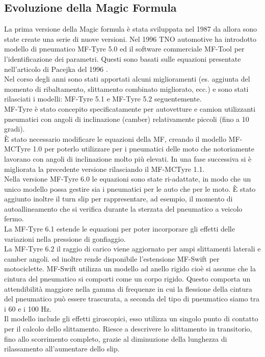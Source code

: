 \subsection{Evoluzione della Magic Formula}
La prima versione della Magic formula è stata sviluppata nel 1987 da allora sono state create una serie di nuove versioni.
Nel 1996 TNO automotive ha introdotto modello di pneumatico MF-Tyre 5.0 ed il software commerciale MF-Tool per l'identificazione dei parametri. Questi sono basati sulle equazioni presentate nell'articolo di Pacejka del 1996 \cite{Pacejka1997MagicFT}.\\ 
Nel corso degli anni sono stati apportati alcuni miglioramenti (es. aggiunta del
momento di ribaltamento, slittamento combinato migliorato, ecc.) e sono stati rilasciati i modelli: MF-Tyre 5.1 e MF-Tyre 5.2 seguentemente.\\ 
MF-Tyre è stato concepito specificatamente per autovetture e camion utilizzanti pneumatici con
angoli di inclinazione (camber) relativamente piccoli (fino a 10 gradi).\\
È stato necessario modificare le equazioni della MF, creando il modello MF-MCTyre 1.0 per poterlo utilizzare per i pneumatici delle moto che notoriamente lavorano con angoli di inclinazione molto più elevati. In una fase successiva si è migliorata la precedente versione rilasciando il MF-MCTyre 1.1.\\
Nella versione MF-Tyre 6.0 le equazioni sono state ri-adattate, in modo che un unico modello possa gestire sia i pneumatici per le auto che per le moto.
È stato aggiunto inoltre il turn slip per rappresentare, ad esempio, il momento di autoallineamento
che si verifica durante la sterzata del pneumatico a veicolo fermo.\\ 
La MF-Tyre 6.1 estende le equazioni per poter incorporare gli effetti delle variazioni nella pressione di gonfiaggio.\\
La MF-Tyre 6.2 il raggio di carico viene aggiornato per ampi slittamenti laterali e camber
angoli. ed inoltre rende disponibile l'estensione MF-Swift per motociclette. MF-Swift utilizza un modello ad anello rigido cioè si assume che la cintura del pneumatico si comporti come un corpo rigido. Questo comporta un attendibilità maggiore nella gamma di frequenze in cui la flessione della cintura del pneumatico può essere trascurata, a seconda del tipo di pneumatico siamo tra i 60 e i 100 Hz.\\ 
Il modello include gli effetti giroscopici, esso utilizza un singolo punto di contatto per il calcolo dello slittamento. Riesce a descrivere lo slittamento in transitorio, fino allo scorrimento completo, grazie al diminuzione della lunghezza di rilassamento all'aumentare dello slip. \\
